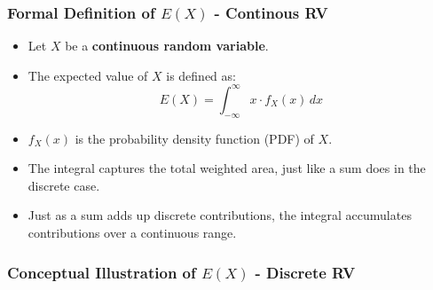 \documentclass[handout]{beamer} %
\begin{document}
\begin{frame} %
\frametitle{Formal Definition of \(E(X)\) - Continous RV}

\begin{itemize}
  \item Let $X$ be a \textbf{continuous random variable}. 
  \item The expected value of $X$ is defined as:
  \pause
  \[
  E(X) = \int_{-\infty}^{\infty} x \cdot f_X(x) \, dx
  \]
  \pause
  \item \(f_X(x)\) is the probability density function (PDF) of \(X\).
  \pause
  \item The integral captures the total weighted area, just like a sum does in the discrete case.
  \pause
  \item Just as a sum adds up discrete contributions, the integral accumulates contributions over a continuous range.
\end{itemize}

\end{frame} 


\begin{frame} %
    \frametitle{Conceptual Illustration of $E(X)$ - Discrete RV}

    \begin{figure}
        \centering
    \end{figure}

\end{frame}
\end{document}
